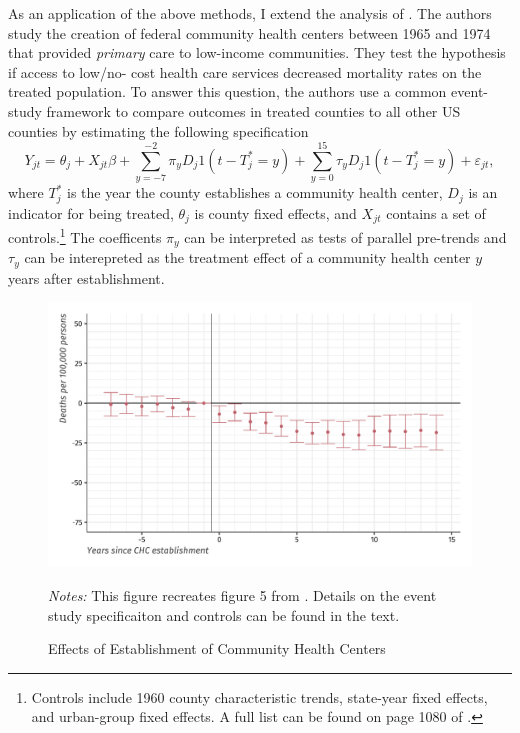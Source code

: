 \documentclass[11pt]{article}
\begin{document}
As an application of the above methods, I extend the analysis of \citet{Bailey_Goodman_Bacon_2015}. The authors study the creation of federal community health centers between 1965 and 1974 that provided \textit{primary} care to low-income communities. They test the hypothesis if access to low/no- cost health care services decreased mortality rates on the treated population. To answer this question, the authors use a common event-study framework to compare outcomes in treated counties to all other US counties by estimating the following specification 
\begin{equation}\label{eq:chc_es}
    Y_{jt} = \theta_j + X_{jt} \beta + \sum_{y = -7}^{-2} \pi_y D_j 1(t - T_j^* = y) + \sum_{y = 0}^{15} \tau_{y} D_j 1(t - T_j^* = y) + \varepsilon_{jt},
\end{equation}
where $T_j^*$ is the year the county establishes a community health center, $D_j$ is an indicator for being treated, $\theta_j$ is county fixed effects, and $X_{jt}$ contains a set of controls.\footnote{Controls include 1960 county characteristic trends, state-year fixed effects, and urban-group fixed effects. A full list can be found on page 1080 of \citet{Bailey_Goodman_Bacon_2015}.} The coefficents $\pi_y$ can be interpreted as tests of parallel pre-trends and $\tau_y$ can be interepreted as the treatment effect of a community health center $y$ years after establishment. 

\begin{figure}[tb!]
    \caption{Effects of Establishment of Community Health Centers}
    \label{fig:chc_es}
        
        {\centering
            \includegraphics[width=\textwidth]{../../figures/figure-chc-es_original.pdf}
        }

    {\footnotesize
        \textit{Notes:} This figure recreates figure 5 from \citet{Bailey_Goodman_Bacon_2015}. Details on the event study specificaiton and controls can be found in the text.
    }
\end{figure}
\end{document}

